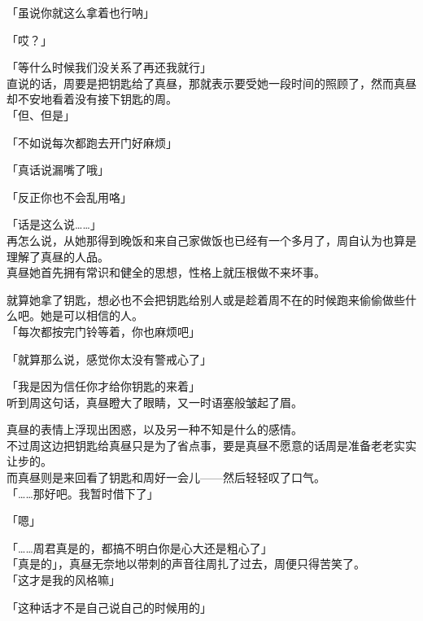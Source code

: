 「虽说你就这么拿着也行呐」

「哎？」

「等什么时候我们没关系了再还我就行」\\

直说的话，周要是把钥匙给了真昼，那就表示要受她一段时间的照顾了，然而真昼却不安地看着没有接下钥匙的周。\\

「但、但是」

「不如说每次都跑去开门好麻烦」

「真话说漏嘴了哦」

「反正你也不会乱用咯」

「话是这么说……」\\

再怎么说，从她那得到晚饭和来自己家做饭也已经有一个多月了，周自认为也算是理解了真昼的人品。\\

真昼她首先拥有常识和健全的思想，性格上就压根做不来坏事。

就算她拿了钥匙，想必也不会把钥匙给别人或是趁着周不在的时候跑来偷偷做些什么吧。她是可以相信的人。\\

「每次都按完门铃等着，你也麻烦吧」

「就算那么说，感觉你太没有警戒心了」

「我是因为信任你才给你钥匙的来着」\\

听到周这句话，真昼瞪大了眼睛，又一时语塞般皱起了眉。

真昼的表情上浮现出困惑，以及另一种不知是什么的感情。\\

不过周这边把钥匙给真昼只是为了省点事，要是真昼不愿意的话周是准备老老实实让步的。\\

而真昼则是来回看了钥匙和周好一会儿——然后轻轻叹了口气。\\

「……那好吧。我暂时借下了」

「嗯」

「……周君真是的，都搞不明白你是心大还是粗心了」\\

「真是的」，真昼无奈地以带刺的声音往周扎了过去，周便只得苦笑了。\\

「这才是我的风格嘛」

「这种话才不是自己说自己的时候用的」\\

